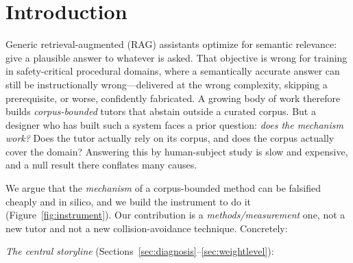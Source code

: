 \documentclass{article}
\newcommand{\kc}{\textsc{kc}}
\begin{document}
\begin{abstract}
Unlike faithfulness (RAGAS) and
context-attribution (ContextCite), which measure whether context \emph{supported} or
\emph{influenced} an output, we measure whether the model \emph{needed} it, against a
weight-level baseline they lack. The method is \emph{closed-model compatible} (API access
only) and operates \emph{per item}. As breadth we report: a \emph{learner ladder} that reads corpus
contribution beyond mere existence---decision \emph{quality} (avoiding well, not just avoiding) and
\emph{reasoning depth} (using a local rule that overrides a reflex, not just looking one up);
cross-model discrimination across current LLMs; a second control domain (roadside tire change);
\kc$\to$single-metric identifiability and estimator-recovery calibration; and a machine-unlearning arm
that yields a \emph{says\,$\neq$\,does} dissociation (gentle unlearning changes what a model \emph{says}
but not what the instrument sees it \emph{do}) as supporting weight-level evidence. All results
are \textbf{simulation-based mechanism evidence, not human-subject external validity}; we
scope the contribution accordingly and pre-register the human study as future work.
\end{abstract}

\section{Introduction}
Generic retrieval-augmented (RAG) assistants optimize for semantic relevance: give a
plausible answer to whatever is asked. That objective is wrong for training in
safety-critical procedural domains, where a semantically accurate answer can still be
instructionally wrong---delivered at the wrong complexity, skipping a prerequisite, or
worse, confidently fabricated. A growing body of work therefore builds
\emph{corpus-bounded} tutors that abstain outside a curated corpus. But a designer who has
built such a system faces a prior question: \emph{does the mechanism work?} Does the tutor
actually rely on its corpus, and does the corpus actually cover the domain? Answering this
by human-subject study is slow and expensive, and a null result there conflates many
causes.

We argue that the \emph{mechanism} of a corpus-bounded method can be falsified cheaply and
in silico, and we build the instrument to do it (Figure~\ref{fig:instrument}). Our contribution is a
\emph{methods/measurement} one, not a new tutor and not a new collision-avoidance
technique. Concretely:

\emph{The central storyline} (Sections~\ref{sec:diagnosis}--\ref{sec:weightlevel}):
\end{document}
